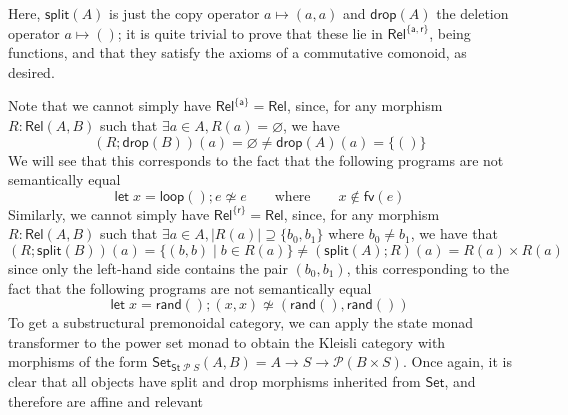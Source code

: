 \documentclass[acmsmall,screen,review]{acmart}
\newcommand{\mc}[1]{\ensuremath{\mathcal{#1}}}
\newcommand{\ms}[1]{\ensuremath{\mathsf{#1}}}
\begin{document}
Here, \(\ms{split}(A)\) is just the copy operator \(a \mapsto (a, a)\) and \(\ms{drop}(A)\) the deletion operator \(a \mapsto ()\); it is quite trivial to prove that these lie in \(\ms{Rel}^{\{\ms{a}, \ms{r}\}}\), being functions, and that they satisfy the axioms of a commutative comonoid, as desired. 

Note that we cannot simply have \(\ms{Rel}^{\{\ms{a}\}} = \ms{Rel}\), since, for any morphism \(R: \ms{Rel}(A, B)\) such that \(\exists a \in A, R(a) = \varnothing\), we have
\begin{equation}
  (R;\ms{drop}(B))(a) = \varnothing \neq \ms{drop}(A)(a) = \{()\}
\end{equation}
We will see that this corresponds to the fact that the following programs are not semantically equal
\begin{equation}
  \ms{let}\;x = \ms{loop}(); e \not\simeq e \qquad \text{where} \qquad x \notin \ms{fv}(e)
\end{equation}
Similarly, we cannot simply have \(\ms{Rel}^{\{\ms{r}\}} = \ms{Rel}\), since, for any morphism \(R: \ms{Rel}(A, B)\) such that \(\exists a \in A, |R(a)| \supseteq \{b_0, b_1\}\) where \(b_0 \neq b_1\), we have that
\begin{equation}
  (R;\ms{split}(B))(a) = \{(b, b) \mid b \in R(a)\} \neq (\ms{split}(A);R)(a) = R(a) \times R(a) 
\end{equation}
since only the left-hand side contains the pair \((b_0, b_1)\), this corresponding to the fact that the following programs are not semantically equal
\begin{equation}
  \ms{let}\;x = \ms{rand}(); (x, x) \not\simeq (\ms{rand}(), \ms{rand}())
\end{equation}
To get a substructural premonoidal category, we can apply the state monad transformer to the power set monad to obtain the Kleisli category with morphisms of the form \(\ms{Set}_{\ms{St}\;\mc{P}\;S}(A, B) = A \to S \to \mc{P}(B \times S)\). Once again, it is clear that all objects have split and drop morphisms inherited from \(\ms{Set}\), and therefore are affine and relevant
\end{document}
